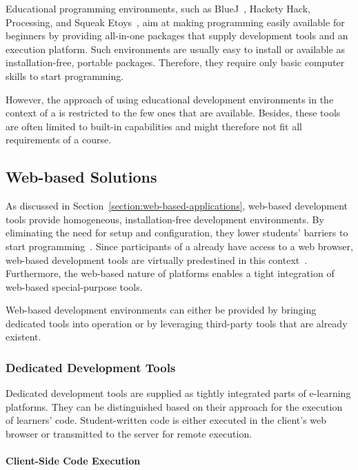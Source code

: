Educational programming environments, such as BlueJ~\cite{kolling2003bluej}, Hackety Hack, Processing, and Squeak Etoys~\cite{kay2005squeak}, aim at making programming easily available for beginners by providing all-in-one packages that supply development tools and an execution platform. Such environments are usually easy to install or available as installation-free, portable packages. Therefore, they require only basic computer skills to start programming.

However, the approach of using educational development environments in the context of a \mooc is restricted to the few ones that are available. Besides, these tools are often limited to built-in capabilities and might therefore not fit all requirements of a course.

\subsection{Web-based Solutions}

As discussed in Section~\ref{section:web-based-applications}, web-based development tools provide homogeneous, installation-free development environments. By eliminating the need for setup and configuration, they lower students' barriers to start programming~\cite{vogel2014quality}. Since participants of a \mooc already have access to a web browser, web-based development tools are virtually predestined in this context~\cite{zachary2003exploiting}. Furthermore, the web-based nature of \mooc platforms enables a tight integration of web-based special-purpose tools.

Web-based development environments can either be provided by bringing dedicated tools into operation or by leveraging third-party tools that are already existent.

\subsubsection{Dedicated Development Tools}

Dedicated development tools are supplied as tightly integrated parts of e-learning platforms. They can be distinguished based on their approach for the execution of learners' code. Student-written code is either executed in the client's web browser or transmitted to the server for remote execution.

\paragraph{Client-Side Code Execution}

